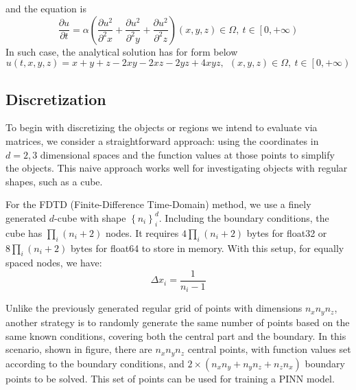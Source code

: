 and the equation is 
\begin{equation} \label{EQ:Heat3D}
  \frac{\partial u}{\partial t} = \alpha \left(
    \frac{\partial u^2}{\partial^2 x}
    +
    \frac{\partial u^2}{\partial^2 y}
    +
    \frac{\partial u^2}{\partial^2 z}
  \right) (x,y, z) \in \Omega, \: t \in \left[0, +\infty\right) 
\end{equation}
In such case, the analytical solution has for form below 
\begin{equation}\label{EQ_SOLUTION_3D}
  u(t,x,y,z) = x + y + z - 2xy - 2xz - 2yz + 4xyz, \:\:(x,y,z) \in \Omega,\: t \in \left[0, +\infty\right)
\end{equation}


\subsection{Discretization}
To begin with discretizing the objects or regions we intend to 
evaluate via matrices, we consider a straightforward approach: 
using the coordinates in $d=2,3$ dimensional spaces and the function 
values at those points to simplify the objects. 
This naive approach works well for investigating objects with regular shapes, such as a cube.

For the FDTD (Finite-Difference Time-Domain) method, we use a finely 
generated $d$-cube with shape $\left\{n_i\right\}_i^{d}$. Including 
the boundary conditions, the cube has $\prod_i (n_i+2)$ nodes. 
It requires $4\prod_i (n_i+2)$ bytes for float32 or $8\prod_i (n_i+2)$ bytes 
for float64 to store in memory. 
With this setup, for equally spaced nodes, we have:
\begin{equation}
  \Delta x_i = \frac{1}{n_i-1}
\end{equation}

Unlike the previously generated regular grid of 
points with dimensions $n_xn_yn_z$, 
another strategy is to randomly generate the same number of points based on the same known conditions, 
covering both the central part and the boundary. 
In this scenario, 
shown in figure, 
there are $n_x n_yn_z$ central points, 
with function values set according to the boundary conditions, 
and $2 \times(n_xn_y + n_yn_z + n_zn_x)$ boundary points to be solved. 
This set of points can be used for training a PINN model.


